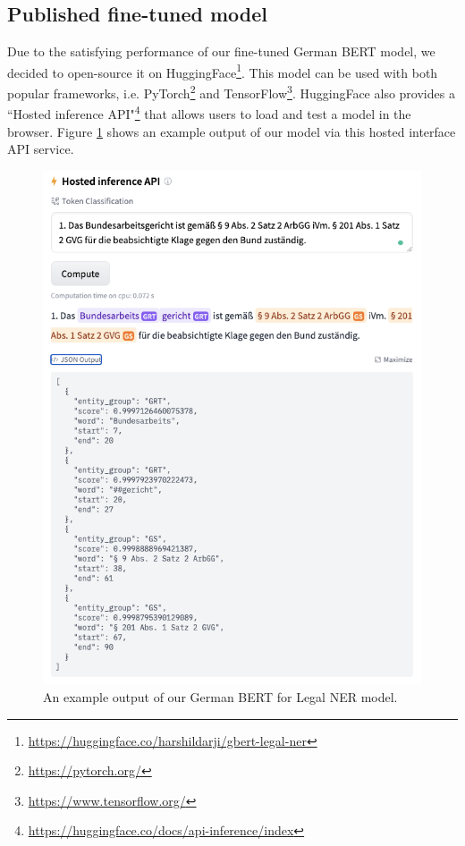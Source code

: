 \documentclass[a4paper,twoside]{article}
\begin{document}
\subsection{Published fine-tuned model}

Due to the satisfying performance of our fine-tuned German BERT model, we decided to open-source it on HuggingFace\footnote{\url{https://huggingface.co/harshildarji/gbert-legal-ner}}. This model can be used with both popular frameworks, i.e. PyTorch\footnote{\url{https://pytorch.org/}} and TensorFlow\footnote{\url{https://www.tensorflow.org/}}. HuggingFace also provides a ``Hosted inference API"\footnote{\url{https://huggingface.co/docs/api-inference/index}} that allows users to load and test a model in the browser. Figure \ref{fig:gbert-ner} shows an example output of our model via this hosted interface API service.

\begin{figure}[!h]
	\centering
	\includegraphics[width=1.0\linewidth]{latex/gbert-ner.png}
	\caption{An example output of our German BERT for Legal NER model.}
	\label{fig:gbert-ner}
\end{figure}
\end{document}
